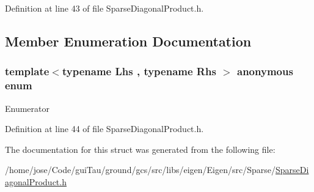 Definition at line 43 of file Sparse\-Diagonal\-Product.\-h.



\subsection{Member Enumeration Documentation}
\hypertarget{structei__traits_3_01_sparse_diagonal_product_3_01_lhs_00_01_rhs_01_4_01_4_abe5298206f950e6ab261fec4055a13d4}{\subsubsection[{anonymous enum}]{\setlength{\rightskip}{0pt plus 5cm}template$<$typename Lhs , typename Rhs $>$ anonymous enum}}\label{structei__traits_3_01_sparse_diagonal_product_3_01_lhs_00_01_rhs_01_4_01_4_abe5298206f950e6ab261fec4055a13d4}
\begin{Desc}
\item[Enumerator]\par
\begin{description}
\item[{\em 
\hypertarget{structei__traits_3_01_sparse_diagonal_product_3_01_lhs_00_01_rhs_01_4_01_4_abe5298206f950e6ab261fec4055a13d4a8c635702ad9954da7cf44e9c1b987dd5}{Sparse\-Flags}\label{structei__traits_3_01_sparse_diagonal_product_3_01_lhs_00_01_rhs_01_4_01_4_abe5298206f950e6ab261fec4055a13d4a8c635702ad9954da7cf44e9c1b987dd5}
}]\item[{\em 
\hypertarget{structei__traits_3_01_sparse_diagonal_product_3_01_lhs_00_01_rhs_01_4_01_4_abe5298206f950e6ab261fec4055a13d4a4b77a525aa7ef2922e27c8cf86d38005}{Flags}\label{structei__traits_3_01_sparse_diagonal_product_3_01_lhs_00_01_rhs_01_4_01_4_abe5298206f950e6ab261fec4055a13d4a4b77a525aa7ef2922e27c8cf86d38005}
}]\end{description}
\end{Desc}


Definition at line 44 of file Sparse\-Diagonal\-Product.\-h.



The documentation for this struct was generated from the following file\-:\begin{DoxyCompactItemize}
\item 
/home/jose/\-Code/gui\-Tau/ground/gcs/src/libs/eigen/\-Eigen/src/\-Sparse/\hyperlink{_sparse_diagonal_product_8h}{Sparse\-Diagonal\-Product.\-h}\end{DoxyCompactItemize}
